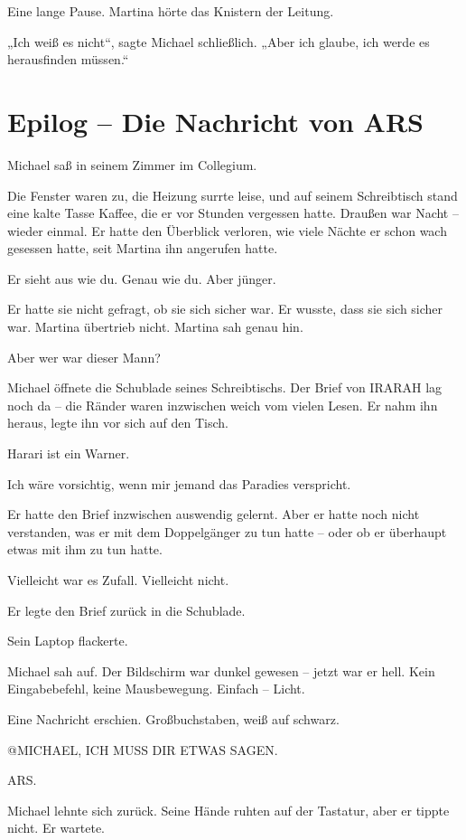 \documentclass[
]{article}
\begin{document}
Eine lange Pause. Martina hörte das Knistern der Leitung.

„Ich weiß es nicht``, sagte Michael schließlich. „Aber ich glaube, ich werde es herausfinden müssen.``

\section{Epilog -- Die Nachricht von ARS}\label{epilog-die-nachricht-von-ars}

Michael saß in seinem Zimmer im Collegium.

Die Fenster waren zu, die Heizung surrte leise, und auf seinem Schreibtisch stand eine kalte Tasse Kaffee, die er vor Stunden vergessen hatte. Draußen war Nacht -- wieder einmal. Er hatte den Überblick verloren, wie viele Nächte er schon wach gesessen hatte, seit Martina ihn angerufen hatte.

Er sieht aus wie du. Genau wie du. Aber jünger.

Er hatte sie nicht gefragt, ob sie sich sicher war. Er wusste, dass sie sich sicher war. Martina übertrieb nicht. Martina sah genau hin.

Aber wer war dieser Mann?

Michael öffnete die Schublade seines Schreibtischs. Der Brief von IRARAH lag noch da -- die Ränder waren inzwischen weich vom vielen Lesen. Er nahm ihn heraus, legte ihn vor sich auf den Tisch.

Harari ist ein Warner.

Ich wäre vorsichtig, wenn mir jemand das Paradies verspricht.

Er hatte den Brief inzwischen auswendig gelernt. Aber er hatte noch nicht verstanden, was er mit dem Doppelgänger zu tun hatte -- oder ob er überhaupt etwas mit ihm zu tun hatte.

Vielleicht war es Zufall. Vielleicht nicht.

Er legte den Brief zurück in die Schublade.

Sein Laptop flackerte.

Michael sah auf. Der Bildschirm war dunkel gewesen -- jetzt war er hell. Kein Eingabebefehl, keine Mausbewegung. Einfach -- Licht.

Eine Nachricht erschien. Großbuchstaben, weiß auf schwarz.

@MICHAEL, ICH MUSS DIR ETWAS SAGEN.

ARS.

Michael lehnte sich zurück. Seine Hände ruhten auf der Tastatur, aber er tippte nicht. Er wartete.
\end{document}
